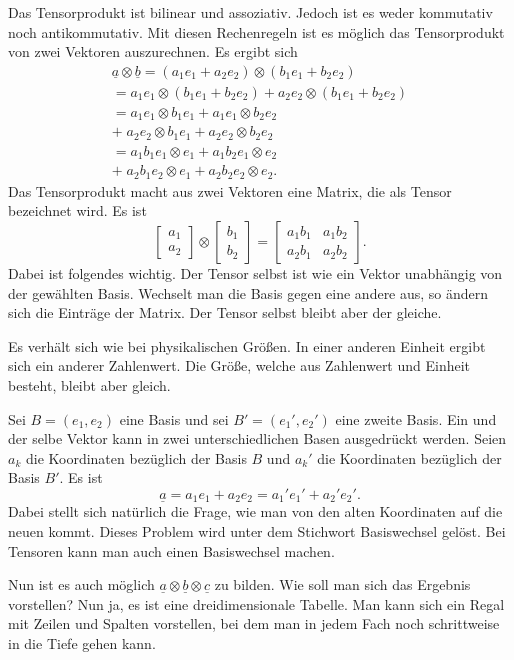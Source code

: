 \documentclass[a4paper,10pt,fleqn,twocolumn,twoside]{article}
\begin{document}
Das Tensorprodukt ist bilinear und assoziativ. Jedoch ist es
weder kommutativ noch antikommutativ. Mit diesen Rechenregeln
ist es möglich das Tensorprodukt von zwei Vektoren auszurechnen.
Es ergibt sich
\begin{gather*}
\underline a\otimes\underline b
= (a_1e_1+a_2e_2)\otimes (b_1e_1+b_2e_2)\\
= a_1e_1\otimes (b_1e_1+b_2e_2)
+ a_2e_2\otimes (b_1e_1+b_2e_2)\\
= a_1e_1\otimes b_1e_1+a_1e_1\otimes b_2e_2\\
+\; a_2e_2\otimes b_1e_1+a_2e_2\otimes b_2e_2\\
= a_1b_1 e_1\otimes e_1+a_1b_2 e_1\otimes e_2\\
+\; a_2b_1 e_2\otimes e_1+a_2b_2 e_2\otimes e_2.
\end{gather*}
\noindent
Das Tensorprodukt macht aus zwei Vektoren eine Matrix, die als Tensor
bezeichnet wird. Es ist
\[\begin{bmatrix}a_1\\ a_2\end{bmatrix}\otimes
\begin{bmatrix}b_1\\ b_2\end{bmatrix}
=\begin{bmatrix}
a_1b_1 & a_1b_2\\
a_2b_1 & a_2b_2
\end{bmatrix}.\]
\noindent
Dabei ist folgendes wichtig. Der Tensor selbst ist wie ein Vektor
unabhängig von der gewählten Basis. Wechselt man die Basis gegen
eine andere aus, so ändern sich die Einträge der Matrix. Der Tensor
selbst bleibt aber der gleiche.

Es verhält sich wie bei physikalischen Größen.
In einer anderen Einheit ergibt sich ein anderer Zahlenwert.
Die Größe, welche aus Zahlenwert und Einheit besteht, bleibt aber
gleich.

Sei $B=(e_1,e_2)$ eine Basis und sei $B'=(e_1',e_2')$ eine zweite
Basis. Ein und der selbe Vektor kann in zwei unterschiedlichen Basen
ausgedrückt werden. Seien $a_k$ die Koordinaten bezüglich der
Basis $B$ und $a_k'$ die Koordinaten bezüglich der Basis $B'$.
Es ist
\[\underline a = a_1e_1+a_2e_2 = a_1'e_1'+a_2'e_2'.\]
Dabei stellt sich natürlich die Frage, wie man von den alten
Koordinaten auf die neuen kommt. Dieses Problem wird unter dem
Stichwort Basiswechsel gelöst. Bei Tensoren kann man auch einen
Basiswechsel machen.

Nun ist es auch möglich
$\underline a\otimes\underline b\otimes \underline c$
zu bilden. Wie soll man sich das Ergebnis vorstellen? Nun ja,
es ist eine dreidimensionale Tabelle. Man kann sich ein Regal mit
Zeilen und Spalten vorstellen, bei dem man in jedem Fach noch
schrittweise in die Tiefe gehen kann.
\end{document}
